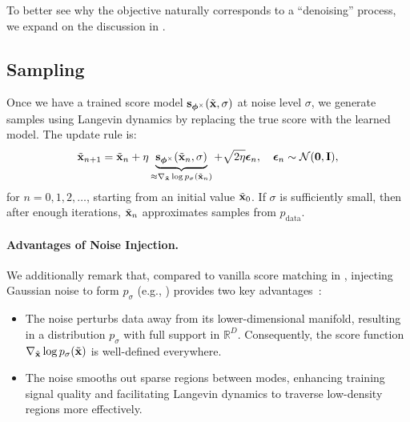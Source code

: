 To better see why the objective naturally corresponds to a ``denoising'' process,
we expand on the discussion in .





\subsection{Sampling} Once we have a trained score model ${\mathbf{s}}_{\bm{\phi}^\times}(\tilde{{\mathbf{x}}}, \sigma)$ at noise level $\sigma$, we generate samples using Langevin dynamics by replacing the true score with the learned model. The update rule is:
\begin{align}\label{eq:score-langevin-emp-dsm}
   \tilde{{\mathbf{x}}}_{n+1} = \tilde{{\mathbf{x}}}_n + \eta \underbrace{{\mathbf{s}}_{\bm{\phi}^\times}(\tilde{{\mathbf{x}}}_n, \sigma)}_{\approx \nabla_{\tilde{{\mathbf{x}}}} \log p_\sigma(\tilde{{\mathbf{x}}}_n)} + \sqrt{2\eta}    \bm{\epsilon}_n, \quad \bm{\epsilon}_n \sim \mathcal{N}(\mathbf{0}, {\mathbf{I}}),
\end{align}
for $n = 0, 1, 2, \dots$, starting from an initial value $\tilde{{\mathbf{x}}}_0$. If $\sigma$ is sufficiently small, then after enough iterations, $\tilde{{\mathbf{x}}}_n$ approximates samples from $p_{\text{data}}$.


\paragraph{Advantages of Noise Injection.}
We additionally remark that, compared to vanilla score matching in , injecting Gaussian noise to form $p_\sigma$ (e.g., ) provides two key advantages~\citep{song2019generative}:
\begin{itemize}
  \item {} The noise perturbs data away from its lower-dimensional manifold, resulting in a distribution $p_\sigma$ with full support in $\mathbb{R}^D$. Consequently, the score function $\nabla_{\tilde{{\mathbf{x}}}} \log p_\sigma(\tilde{{\mathbf{x}}})$ is well-defined everywhere.
  \item {} The noise smooths out sparse regions between modes, enhancing training signal quality and facilitating Langevin dynamics to traverse low-density regions more effectively.
\end{itemize}


